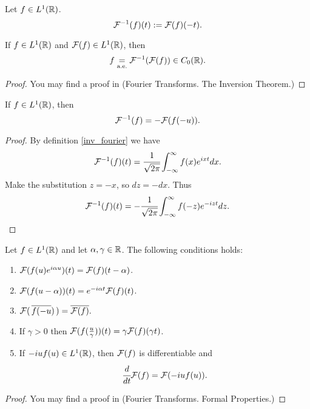 \documentclass[main.tex]{subfiles}
\begin{document}
\begin{definition}
\label{inv_fourier}
Let $f\in L^1(\mathbb{R})$.
\begin{equation}
    \mathcal{F}^{-1}(f)(t) := \mathcal{F}(f)(-t). 
\end{equation}
\end{definition}

\begin{theorem}
If $f\in L^1(\mathbb{R})$ and $\mathcal{F}(f)\in L^1(\mathbb{R})$, then
\begin{equation}
    f \underset{\text{a.e.}}{=} \mathcal{F}^{-1}(\mathcal{F}(f)) \in C_0(\mathbb{R}).
\end{equation} 
\end{theorem}
\begin{proof}
You may find a proof in \cite{rudin1987} (Fourier Transforms. The Inversion Theorem.)
\end{proof}

\begin{theorem}
If $f\in L^1(\mathbb{R})$, then
\begin{equation}
    \mathcal{F}^{-1}(f) = -\mathcal{F}(f(-u)).
\end{equation}
\end{theorem}
\begin{proof}
By definition \ref{inv_fourier} we have
\begin{equation}
     \mathcal{F}^{-1}(f)(t) = \cfrac{1}{\sqrt{2\pi}}\int_{-\infty}^{\infty} f(x)e^{ixt}dx.
\end{equation}
Make the substitution $z = -x$, so $dz = -dx$. Thus
\begin{equation}
    \mathcal{F}^{-1}(f)(t) = -\cfrac{1}{\sqrt{2\pi}}\int_{-\infty}^{\infty} f(-z)e^{-izt}dz.
\end{equation}
\end{proof}

\begin{theorem}
\label{fourier_formal}
Let $f\in L^1(\mathbb{R})$ and let $\alpha, \gamma\in\mathbb{R}$. The following conditions holds:
\begin{enumerate}
\item
$\mathcal{F}(f(u)e^{i\alpha u})(t) = \mathcal{F}(f)(t - \alpha)$.
\item
$\mathcal{F}(f(u - \alpha))(t) =e^{-i\alpha t}\mathcal{F}(f)(t)$.
\item
$\mathcal{F}(\, \overline{f(-u}) \,) = \overline{\mathcal{F}(f)}.$    

\item
If $\gamma > 0$ then $\mathcal{F}({f(\frac{u}{\gamma})})(t) = \gamma \mathcal{F}(f)(\gamma t)$.

\item
If $-iuf(u)\in L^1(\mathbb{R})$, then $\mathcal{F}(f)$ is differentiable and
\begin{equation}
    \cfrac{d}{dt}\mathcal{F}(f) = \mathcal{F}(-iuf(u)).
\end{equation}
\end{enumerate}
\end{theorem}
\begin{proof}
You may find a proof in \cite{rudin1987} (Fourier Transforms. Formal Properties.)
\end{proof}
\end{document}
